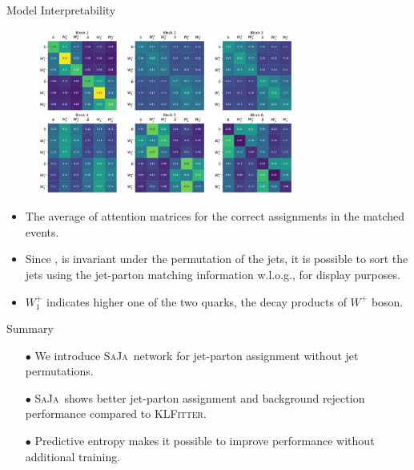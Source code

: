 \begin{frame}[fragile]{Model Interpretability}
  \begin{figure}
    \centering
    \includegraphics[width=0.75\textwidth]{fig/attention-matrix/attention_tt_mg5_pythia8_alljets_dR-0.30_test_delphys_minmax_jet-shape_correct.pdf}
  \end{figure}
  
  {\footnotesize
    \begin{itemize}
      \item The average of attention matrices for the correct assignments in the matched \ttbar events.
      \item Since \saja, is invariant under the permutation of the jets,
            it is possible to sort the jets using the jet-parton matching information w.l.o.g., for display purposes.
      \item $W_{1}^{+}$ indicates higher \pt one of the two quarks, the decay products of $W^{+}$ boson.
    \end{itemize}
  }
\end{frame}


\begin{frame}[fragile]{Summary}
  \begin{itemize}
    \item[$\bullet$] We introduce \textsc{SaJa}\, network for jet-parton assignment without jet permutations.
    \item[$\bullet$] \textsc{SaJa}\, shows better jet-parton assignment and background rejection performance compared to \textsc{KLFitter}.
    \item[$\bullet$] Predictive entropy makes it possible to improve performance without additional training.
  \end{itemize}
\end{frame}
